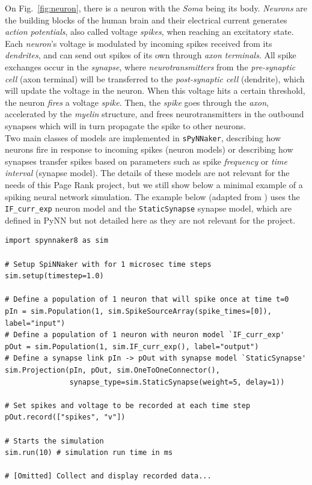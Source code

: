 On Fig.~\ref{fig:neuron}, there is a neuron with the \textit{Soma} being its body. \textit{Neurons} are the building blocks of the human brain and their electrical current generates \textit{action potentials}, also called voltage \textit{spikes}, when reaching an excitatory state. Each \textit{neuron}'s voltage is modulated by incoming spikes received from its \textit{dendrites}, and can send out spikes of its own through \textit{axon terminals}. All spike exchanges occur in the \textit{synapse}, where \textit{neurotransmitters} from the \textit{pre-synaptic cell} (axon terminal) will be transferred to the \textit{post-synaptic cell} (dendrite), which will update the voltage in the neuron. When this voltage hits a certain threshold, the neuron \textit{fires} a voltage \textit{spike}. Then, the \textit{spike} goes through the \textit{axon}, accelerated by the \textit{myelin} structure, and frees neurotransmitters in the outbound synapses which will in turn propagate the spike to other neurons. \\

Two main classes of models are implemented in \texttt{sPyNNaker}, describing how neurons fire in response to incoming spikes (neuron models) or describing how synapses transfer spikes based on parameters such as spike \textit{frequency} or \textit{time interval} (synapse model). The details of these models are not relevant for the needs of this Page Rank project, but we still show below a minimal example of a spiking neural network simulation. The example below (adapted from \cite{pynnsim}) uses the \texttt{IF\_curr\_exp} neuron model and the \texttt{StaticSynapse} synapse model, which are defined in PyNN \cite{pynn} but not detailed here as they are not relevant for the project. \\

\begin{verbatim}
import spynnaker8 as sim

# Setup SpiNNaker with for 1 microsec time steps
sim.setup(timestep=1.0)

# Define a population of 1 neuron that will spike once at time t=0
pIn = sim.Population(1, sim.SpikeSourceArray(spike_times=[0]), label="input")
# Define a population of 1 neuron with neuron model `IF_curr_exp'
pOut = sim.Population(1, sim.IF_curr_exp(), label="output")
# Define a synapse link pIn -> pOut with synapse model `StaticSynapse'
sim.Projection(pIn, pOut, sim.OneToOneConnector(),
               synapse_type=sim.StaticSynapse(weight=5, delay=1))

# Set spikes and voltage to be recorded at each time step
pOut.record(["spikes", "v"])

# Starts the simulation
sim.run(10) # simulation run time in ms

# [Omitted] Collect and display recorded data...
\end{verbatim}

